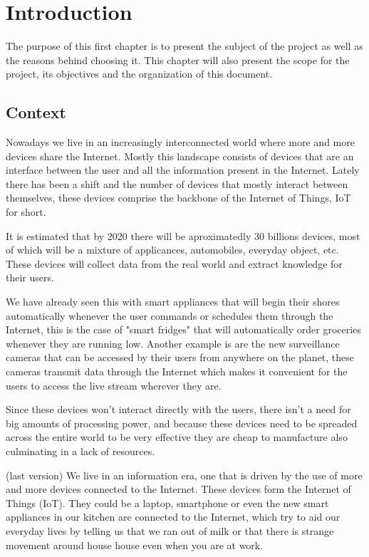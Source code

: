 \chapter{Introduction}
\label{chap:intro}

The purpose of this first chapter is to present the subject of the project as
well as the reasons behind choosing it. This chapter will also present the scope
for the project, its objectives and the organization of this document.

\section{Context}
\label{sec:context} %
Nowadays we live in an increasingly interconnected world where more and more
devices share the Internet. Mostly this landscape consists of devices that are
an interface between the user and all the information present in the Internet.
Lately there has been a shift and the number of devices that mostly interact
between themselves, these devices comprise the backbone of the Internet of
Things, IoT for short.

It is estimated that by 2020 there will be aproximatedly 30 billions devices,
most of which will be a mixture of applicances, automobiles, everyday object,
etc. These devices will collect data from the real world and extract knowledge
for their users.

We have already seen this with smart appliances that will begin their shores
automatically whenever the user commands or schedules them through the Internet,
this is the case of "smart fridges" that will automatically order groceries
whenever they are running low. Another example is are the new surveillance
cameras that can be accessed by their users from anywhere on the planet, these
cameras transmit data through the Internet which makes it convenient for the
users to access the live stream wherever they are.

Since these devices won't interact directly with the users, there isn't a need
for big amounts of processing power, and because these devices need to be
spreaded across the entire world to be very effective they are cheap to
manufacture also culminating in a lack of resources.

(last version)
We live in an information era, one that is driven by the use of more and more
devices connected to the Internet. These devices form the Internet of Things
(IoT). They could be a laptop, smartphone or even the new smart appliances in
our kitchen are connected to the Internet, which try to aid our everyday lives
by telling us that we ran out of milk or that there is strange movement around
house house even when you are at work.

